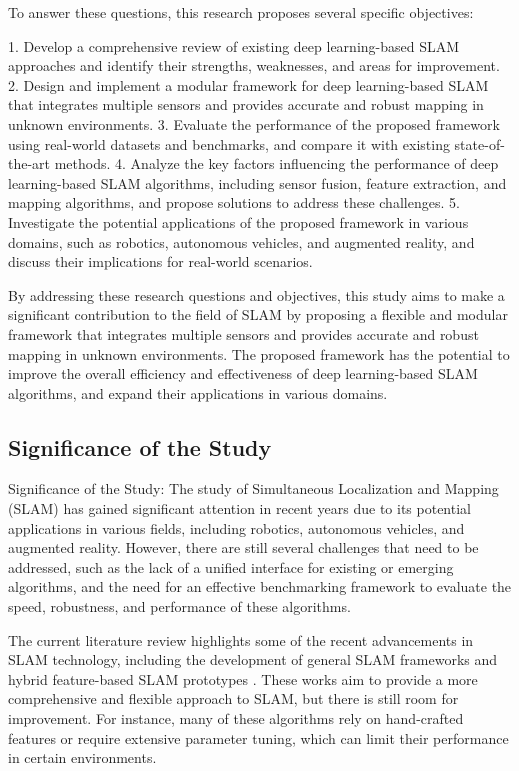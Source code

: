 \documentclass[conference]{IEEEtran}
\begin{document}
To answer these questions, this research proposes several specific objectives:

1. Develop a comprehensive review of existing deep learning-based SLAM approaches and identify their strengths, weaknesses, and areas for improvement.
2. Design and implement a modular framework for deep learning-based SLAM that integrates multiple sensors and provides accurate and robust mapping in unknown environments.
3. Evaluate the performance of the proposed framework using real-world datasets and benchmarks, and compare it with existing state-of-the-art methods.
4. Analyze the key factors influencing the performance of deep learning-based SLAM algorithms, including sensor fusion, feature extraction, and mapping algorithms, and propose solutions to address these challenges.
5. Investigate the potential applications of the proposed framework in various domains, such as robotics, autonomous vehicles, and augmented reality, and discuss their implications for real-world scenarios.

By addressing these research questions and objectives, this study aims to make a significant contribution to the field of SLAM by proposing a flexible and modular framework that integrates multiple sensors and provides accurate and robust mapping in unknown environments. The proposed framework has the potential to improve the overall efficiency and effectiveness of deep learning-based SLAM algorithms, and expand their applications in various domains.

\subsection{Significance of the Study}
Significance of the Study:
The study of Simultaneous Localization and Mapping (SLAM) has gained significant attention in recent years due to its potential applications in various fields, including robotics, autonomous vehicles, and augmented reality. However, there are still several challenges that need to be addressed, such as the lack of a unified interface for existing or emerging algorithms, and the need for an effective benchmarking framework to evaluate the speed, robustness, and performance of these algorithms.

The current literature review highlights some of the recent advancements in SLAM technology, including the development of general SLAM frameworks \cite{gslam} and hybrid feature-based SLAM prototypes \cite{hybrid}. These works aim to provide a more comprehensive and flexible approach to SLAM, but there is still room for improvement. For instance, many of these algorithms rely on hand-crafted features or require extensive parameter tuning, which can limit their performance in certain environments.
\end{document}
